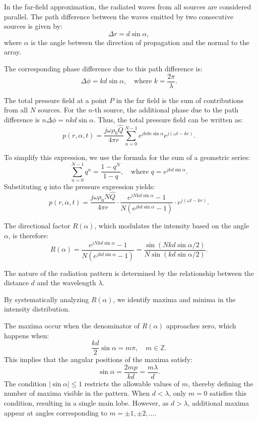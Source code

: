\documentclass[a4paper]{article}
\begin{document}
In the far-field approximation, the radiated waves from all sources are considered parallel. The path difference between the waves emitted by two consecutive sources is given by:
\[
\Delta r = d \sin \alpha,
\]
where \( \alpha \) is the angle between the direction of propagation and the normal to the array.

The corresponding phase difference due to this path difference is:
\[
\Delta \phi = k d \sin \alpha, \quad \text{where } k = \frac{2\pi}{\lambda}.
\]

The total pressure field at a point \( P \) in the far field is the sum of contributions from all \( N \) sources. For the \( n \)-th source, the additional phase due to the path difference is \( n \Delta \phi = n k d \sin \alpha \). Thus, the total pressure field can be written as:
\[
p(r, \alpha, t) = \frac{j \omega \rho_0 \hat{Q}}{4 \pi r} \sum_{n=0}^{N-1} e^{j k d n \sin \alpha} e^{j (\omega t - kr)}.
\]

To simplify this expression, we use the formula for the sum of a geometric series:
\[
\sum_{n=0}^{N-1} q^n = \frac{1 - q^N}{1 - q}, \quad \text{where } q = e^{j k d \sin \alpha}.
\]
Substituting \( q \) into the pressure expression yields:
\[
p(r, \alpha, t)  = \frac{j \omega \rho_0 N \hat{Q}}{4 \pi r} \cdot \frac{e^{j N k d \sin \alpha} - 1}{N \left( e^{j k d \sin \alpha} - 1 \right)} \cdot e^{j (\omega t - k r)}.
\]

The directional factor \( R(\alpha) \), which modulates the intensity based on the angle \( \alpha \), is therefore:
\[
R(\alpha) = \frac{e^{j N k d \sin \alpha} - 1}{N \left( e^{j k d \sin \alpha} - 1 \right)} = \frac{\sin \left( N k d \sin \alpha / 2 \right)}{N \sin \left( k d \sin \alpha / 2 \right)}.
\]




The nature of the radiation pattern is determined by the relationship between the distance \( d \) and the wavelength \( \lambda \). 

By systematically analyzing \( R(\alpha) \), we identify maxima and minima in the intensity distribution.

The maxima occur when the denominator of \( R(\alpha) \) approaches zero, which happens when:
\[
\frac{k d}{2} \sin \alpha = m \pi, \quad m \in \mathbb{Z}.
\]
This implies that the angular positions of the maxima satisfy:
\[
\sin \alpha = \frac{2mp}{kd} = \frac{m \lambda}{d}.
\]
The condition \( |\sin \alpha| \leq 1 \) restricts the allowable values of \( m \), thereby defining the number of maxima visible in the pattern. When \( d < \lambda \), only \( m = 0 \) satisfies this condition, resulting in a single main lobe. However, as \( d > \lambda \), additional maxima appear at angles corresponding to \( m = \pm 1, \pm 2, \ldots \).
\end{document}

